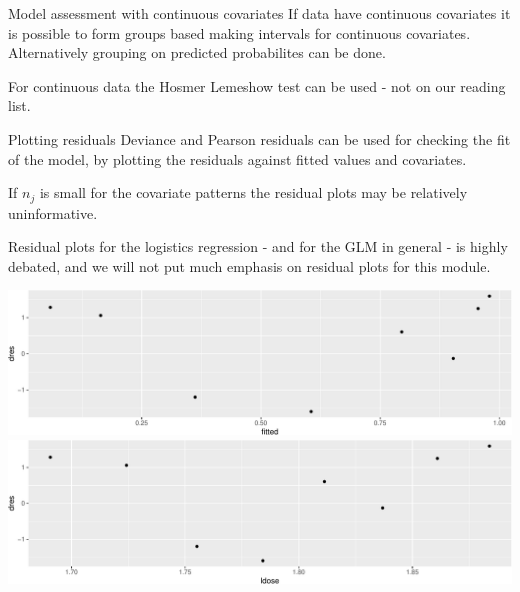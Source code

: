 \documentclass[
  ignorenonframetext,
]{beamer}
\begin{document}
\begin{frame}
\begin{block}{Model assessment with continuous covariates}
\protect\hypertarget{model-assessment-with-continuous-covariates}{}
If data have continuous covariates it is possible to form groups based
making intervals for continuous covariates. Alternatively grouping on
predicted probabilites can be done.

For continuous data the Hosmer Lemeshow test can be used - not on our
reading list.
\end{block}
\end{frame}

\begin{frame}
\begin{block}{Plotting residuals}
\protect\hypertarget{plotting-residuals}{}
Deviance and Pearson residuals can be used for checking the fit of the
model, by plotting the residuals against fitted values and covariates.

If \(n_j\) is small for the covariate patterns the residual plots may be
relatively uninformative.

Residual plots for the logistics regression - and for the GLM in general
- is highly debated, and we will not put much emphasis on residual plots
for this module.
\end{block}
\end{frame}

\begin{frame}
\includegraphics{Module03BinRegPresentationWeek2_files/figure-beamer/unnamed-chunk-10-1.pdf}
\includegraphics{Module03BinRegPresentationWeek2_files/figure-beamer/unnamed-chunk-10-2.pdf}
\end{frame}
\end{document}

